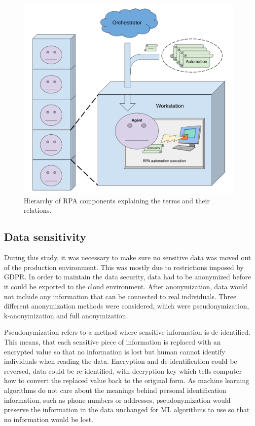 \begin{figure}[htb]
    \centering
    \includegraphics[width=\textwidth,]{./appendices/RPA-hierarchy}
    \caption{Hierarchy of RPA components explaining the terms and their relations.
    \label{fig:rpa-hierarchy}}
\end{figure}



\subsection{Data sensitivity}\label{subsec:bg-data-sensitivity}

During this study,
it was necessary to make sure no sensitive data
was moved out of the production environment.
This was mostly due to restrictions imposed by GDPR\@.
In order to maintain the data security,
data had to be anonymized
before it could be exported to the cloud environment.
After anonymization,
data would not include any information
that can be connected to real individuals.
Three different anonymization methods were considered,
which were pseudonymization, k-anonymization and full anonymization.

Pseudonymization refers to a method
where sensitive information is de-identified.
This means,
that each sensitive piece of information
is replaced with an encrypted value
so that no information is lost
but human cannot identify individuals
when reading the data.
Encryption and de-identification
could be reversed, \ie data could be re-identified,
with decryption key which tells computer
how to convert the replaced value back to the original form.
As machine learning algorithms do not care about the meanings
behind personal identification information,
such as phone numbers or addresses,
pseudonymization would preserve the information in the data unchanged
for ML algorithms to use so that no information would be lost.~\cite{noumeir2007pseudonymization}

